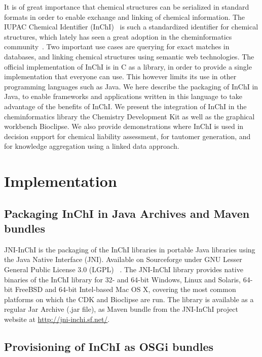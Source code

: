 \documentclass[10pt]{bmc_article}
\newenvironment{bmcformat}{\fussy\setboolean{publ}{true}}{\fussy}
\begin{document}
\begin{bmcformat}
It is of great importance that chemical structures can be serialized in standard formats in order to enable exchange and linking of chemical information. The IUPAC Chemical Identifier (InChI)~\cite{Stein2003} is such a standardized identifier for chemical structures, which lately has seen a great adoption in the cheminformatics community~\cite{OBoyle:2011fk}. Two important use cases are querying for exact matches in databases, and linking chemical structures using semantic web technologies. The official implementation of InChI is in C as a library, in order to provide a single implementation that everyone can use. This however limits its use in other programming languages such as Java. We here describe the packaging of InChI in Java, to enable frameworks and applications written in this language to take advantage of the benefits of InChI. We present the integration of InChI in the cheminformatics library the Chemistry Development Kit as well as the graphical workbench Bioclipse. We also provide demonstrations where InChI is used in decision support for chemical liability assessment, for tautomer generation, and for knowledge aggregation using a linked data approach.
 




\section*{Implementation}

\subsection*{Packaging InChI in Java Archives and Maven bundles}

JNI-InChI is the packaging of the InChI libraries in portable Java libraries using the Java Native Interface (JNI).
Available on Sourceforge under GNU Lesser General Public License 3.0 (LGPL) ~\cite{JNIINCHIURL}.
The JNI-InChI library provides native binaries of the InChI library for 32- and 64-bit Windows, Linux and Solaris,
64-bit FreeBSD and 64-bit Intel-based Mac OS X, covering the most common platforms on which the CDK and Bioclipse are run.
The library is available as a regular Jar Archive (.jar file), as Maven bundle from the JNI-InChI project website
at \url{http://jni-inchi.sf.net/}.

\subsection*{Provisioning of InChI as OSGi bundles}


\end{bmcformat}
\end{document}
